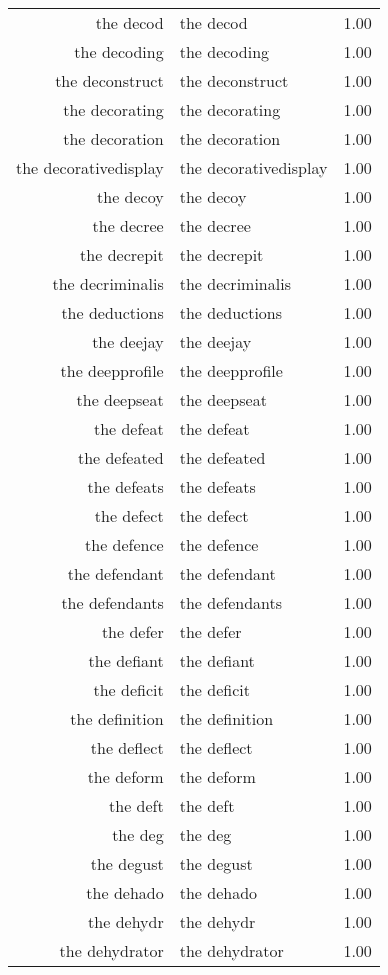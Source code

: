 \begin{table}[ht]
\begin{tabular}{rlr}
  the decod & the decod & 1.00 \\ 
  the decoding & the decoding & 1.00 \\ 
  the deconstruct & the deconstruct & 1.00 \\ 
  the decorating & the decorating & 1.00 \\ 
  the decoration & the decoration & 1.00 \\ 
  the decorativedisplay & the decorativedisplay & 1.00 \\ 
  the decoy & the decoy & 1.00 \\ 
  the decree & the decree & 1.00 \\ 
  the decrepit & the decrepit & 1.00 \\ 
  the decriminalis & the decriminalis & 1.00 \\ 
  the deductions & the deductions & 1.00 \\ 
  the deejay & the deejay & 1.00 \\ 
  the deepprofile & the deepprofile & 1.00 \\ 
  the deepseat & the deepseat & 1.00 \\ 
  the defeat & the defeat & 1.00 \\ 
  the defeated & the defeated & 1.00 \\ 
  the defeats & the defeats & 1.00 \\ 
  the defect & the defect & 1.00 \\ 
  the defence & the defence & 1.00 \\ 
  the defendant & the defendant & 1.00 \\ 
  the defendants & the defendants & 1.00 \\ 
  the defer & the defer & 1.00 \\ 
  the defiant & the defiant & 1.00 \\ 
  the deficit & the deficit & 1.00 \\ 
  the definition & the definition & 1.00 \\ 
  the deflect & the deflect & 1.00 \\ 
  the deform & the deform & 1.00 \\ 
  the deft & the deft & 1.00 \\ 
  the deg & the deg & 1.00 \\ 
  the degust & the degust & 1.00 \\ 
  the dehado & the dehado & 1.00 \\ 
  the dehydr & the dehydr & 1.00 \\ 
  the dehydrator & the dehydrator & 1.00 \\ 

\end{tabular}
\end{table}
